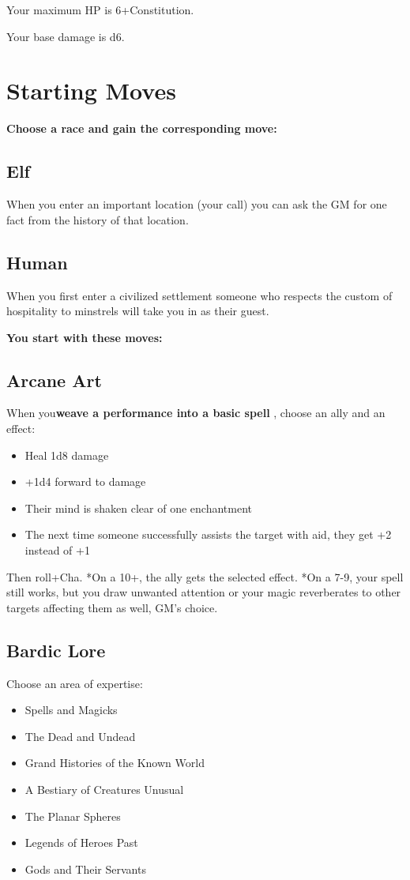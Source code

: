 Your maximum HP is 6+Constitution.

Your base damage is d6.
\section*{Starting Moves}
{\bfseries Choose a race and gain the corresponding move:}
\subsection{Elf}

When you enter an important location (your call) you can ask the GM for one fact from the history of that location.
\subsection{Human}

When you first enter a civilized settlement someone who respects the custom of hospitality to minstrels will take you in as their guest.

\vspace{\baselineskip}
{\bfseries You start with these moves:}
\subsection{Arcane Art} 

When you\textbf{weave a performance into a basic spell}
, choose an ally and an effect:
\begin{itemize}
\item Heal 1d8 damage
\item +1d4 forward to damage
\item Their mind is shaken clear of one enchantment
\item The next time someone successfully assists the target with aid, they get +2 instead of +1

\end{itemize}

Then roll+Cha. *On a 10+, the ally gets the selected effect. *On a 7-9, your spell still works, but you draw unwanted attention or your magic reverberates to other targets affecting them as well, GM's choice.
\subsection{Bardic Lore}

Choose an area of expertise:
\begin{itemize}
\item Spells and Magicks
\item The Dead and Undead
\item Grand Histories of the Known World
\item A Bestiary of Creatures Unusual
\item The Planar Spheres
\item Legends of Heroes Past
\item Gods and Their Servants

\end{itemize}

